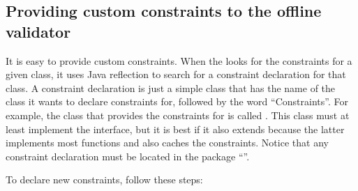 \subsection{Providing custom constraints to the offline validator}

It is easy to provide custom constraints. When the 
looks for the constraints for a given class, it uses Java reflection to
search for a constraint declaration for that class. A constraint declaration
is just a simple class that has the name of the class it wants to declare
constraints for, followed by the word ``Constraints''.  For example, the
class that provides the constraints for \Species is called
. This class must at least implement the
 interface, but it is best if it also extends
 because the latter implements most
functions and also caches the constraints.  Notice that any constraint
declaration must be located in the package
``''.

To declare new constraints, follow these steps:

